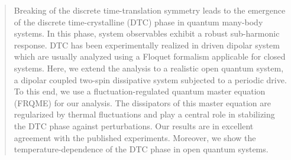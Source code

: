\documentclass[prl,aps,preprint,floatfix]{revtex4-2}
\begin{document}
\begin{abstract}
Breaking of the discrete time-translation symmetry leads to the emergence of the discrete
time-crystalline (DTC) phase in quantum many-body systems. In this phase, system
observables exhibit a robust sub-harmonic response. DTC has been experimentally realized
in driven dipolar system which are usually analyzed using a Floquet formalism
applicable for closed systems.
Here, we extend the analysis to a realistic open quantum
system, a dipolar coupled two-spin dissipative system subjected to a periodic drive. 
To this end, we use a
fluctuation-regulated quantum master equation (FRQME) for our analysis. The dissipators of this
master equation are regularized by thermal fluctuations and play a central role in
stabilizing the DTC phase against perturbations. Our results are in excellent agreement
with the published experiments. Moreover, we show the temperature-dependence of the DTC
phase in open quantum systems.






\end{abstract}

\maketitle
\end{document}
